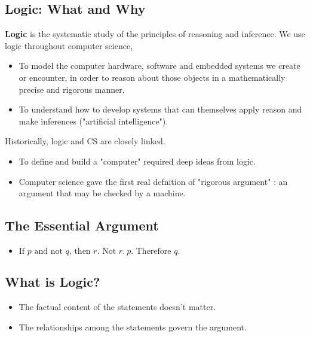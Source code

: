 \documentclass{article}
\newenvironment{exblock}[1]{%
    \tcolorbox[beamer,%
    noparskip,breakable,
    colback=lightgreen,colframe=darkgreen,%
    colbacklower=limegreen!75!lightgreen,%
    title=#1]}%
    {\endtcolorbox}
\newenvironment{ablock}[1]{%
    \tcolorbox[beamer,%
    noparskip,breakable,
    colback=lightcoral,colframe=darkred,%
    colbacklower=tomato!75!lightcoral,%
    title=#1]}%
    {\endtcolorbox}
\begin{document}
\subsection{Logic: What and Why}
\begin{ablock}{As noted on Kevin's Slides}
\textbf{Logic} is the systematic study of the principles of reasoning and inference.
We use logic throughout computer science,

\begin{itemize}
\item To model the computer hardware, software and embedded systems
we create or encounter, in order to reason about those objects in a
mathematically precise and rigorous manner.

\item To understand how to develop systems that can themselves apply
reason and make inferences ("artificial intelligence").
\end{itemize}

Historically, logic and CS are closely linked.

\begin{itemize}
\item To define and build a "computer" required deep ideas from logic.

\item Computer science gave the first real defnition of "rigorous
argument" : an argument that may be checked by a machine.
\end{itemize}
\end{ablock}

\subsection{The Essential Argument}
\begin{itemize}
\item \(\text{If } p \text{ and not } q \text{, then } r. \text{ Not } r. \ p. \text{ Therefore } q.\)
\end{itemize}

\subsection{What is Logic?}

\begin{exblock}{In the essential argument}
\begin{itemize}
\item The factual content of the statements doesn't matter.
\item The relationships among the statements govern the argument.
\end{itemize}
\end{exblock}
\end{document}
